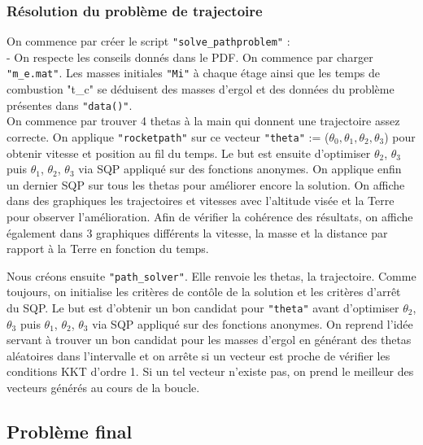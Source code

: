 \subsubsection{Résolution du problème de trajectoire}\medbreak

On commence par créer le script \texttt{"solve\_pathproblem"} : \\
\indent - On respecte les conseils donnés dans le PDF. On commence par charger \texttt{"m\_e.mat"}. Les masses initiales \texttt{"Mi"} à chaque étage ainsi que les temps de combustion "t\_c" se déduisent des masses d'ergol et des données du problème présentes dans \texttt{"data()"}.\\
On commence par trouver 4 thetas à la main qui donnent une trajectoire assez correcte. On applique \texttt{"rocketpath"} sur ce vecteur \texttt{"theta"} := ($\theta_0,\theta_1,\theta_2,\theta_3$) pour obtenir vitesse et position au fil du temps. Le but est ensuite d'optimiser $\theta_2$, $\theta_3$ puis $\theta_1$, $\theta_2$, $\theta_3$ via SQP appliqué sur des fonctions anonymes. On applique enfin un dernier SQP sur tous les thetas pour améliorer encore la solution. On affiche dans des graphiques les trajectoires et vitesses avec l'altitude visée et la Terre pour observer l'amélioration. Afin de vérifier la cohérence des résultats, on affiche également dans 3 graphiques différents la vitesse, la masse et la distance par rapport à la Terre en fonction du temps.\medbreak

Nous créons ensuite \texttt{"path\_solver"}. Elle renvoie les thetas, la trajectoire. Comme toujours, on initialise les critères de contôle de la solution et les critères d'arrêt du SQP. Le but est d'obtenir un bon candidat pour \texttt{"theta"} avant d'optimiser $\theta_2$, $\theta_3$ puis $\theta_1$, $\theta_2$, $\theta_3$ via SQP appliqué sur des fonctions anonymes. On reprend l'idée servant à trouver un bon candidat pour les masses d'ergol en générant des thetas aléatoires dans l'intervalle et on arrête si un vecteur est proche de vérifier les conditions KKT d'ordre 1. Si un tel vecteur n'existe pas, on prend le meilleur des vecteurs générés au cours de la boucle.\medbreak

\subsection{Problème final}\medbreak

